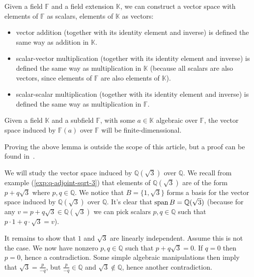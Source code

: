 \begin{lemma}\label{lem:field-extension-vector-space}
  Given a field $\mathbb{F}$ and a field extension $\mathbb{K}$, we can construct a vector space with elements of $\mathbb{F}$ as scalars, elements of $\mathbb{K}$ as vectors:
  \begin{itemize}
    \item vector addition (together with its identity element and inverse) is defined the same way as addition in $\mathbb{K}$. 
    \item scalar-vector multiplication (together with its identity element and inverse) is defined the same way as multiplication in $\mathbb{K}$ (because all scalars are also vectors, since elements of $\mathbb{F}$ are also elements of $\mathbb{K}$).
    \item scalar-scalar multiplication (together with its identity element and inverse) is defined the same way as multiplication in $\mathbb{F}$.
  \end{itemize}
\end{lemma}

\begin{lemma}\label{lem:algebraic-field-finite-vector-space}
   Given a field $\mathbb{K}$ and a subfield $\mathbb{F}$, with some $a \in \mathbb{K}$ algebraic over $\mathbb{F}$, the vector space induced by $\mathbb{F}(a) $ over $\mathbb{F}$ will be finite-dimenssional.
\end{lemma}

Proving the above lemma is outside the scope of this article, but a proof can be found in~\cite{milne2022}.

\begin{exmp}
  We will study the vector space induced by $\mathbb{Q} (\sqrt 3)$ over $\mathbb{Q}$. We recall from example (\ref{exp:q-adjoint-sqrt-3}) that elements of $\mathbb{Q} (\sqrt 3)$ are of the form $p + q \sqrt 3$ where $p, q \in \mathbb{Q}$. We notice that $B = \{1, \sqrt 3\}$ forms a basis for the vector space induced by $\mathbb{Q} (\sqrt 3)$ over $\mathbb{Q} $. It's clear that $\operatorname{span} B = \mathbb{Q} (\sqrt 3)$ (because for any $v = p + q \sqrt 3 \in \mathbb{Q} (\sqrt 3)$ we can pick scalars $p, q \in \mathbb{Q} $ such that $p \cdot 1 + q \cdot \sqrt 3 = v$). 

  It remains to show that $1$ and $\sqrt 3$ are linearly independent. Assume this is not the case. We now have nonzero $p, q \in \mathbb{Q} $ such that $p + q \sqrt 3 = 0$. If $q = 0$ then $p = 0$, hence a contradiction. Some simple algebraic manipulations then imply that $\sqrt 3  = \frac p {-q}$, but $\frac p {-q} \in \mathbb{Q} $ and $\sqrt 3 \not\in \mathbb{Q} $, hence another contradiction.
\end{exmp}
